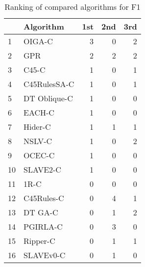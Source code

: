 \begin{table}
\footnotesize
\caption{Ranking of compared algorithms for F1}
\label{tab:places F1}
\begin{tabular}{llrrr}
\hline
 & Algorithm & 1st & 2nd & 3rd \\
\hline
1 & OIGA-C & 3 & 0 & 2 \\
2 & GPR & 2 & 2 & 2 \\
3 & C45-C & 1 & 0 & 1 \\
4 & C45RulesSA-C & 1 & 0 & 1 \\
5 & DT Oblique-C & 1 & 0 & 0 \\
6 & EACH-C & 1 & 0 & 0 \\
7 & Hider-C & 1 & 1 & 1 \\
8 & NSLV-C & 1 & 0 & 2 \\
9 & OCEC-C & 1 & 0 & 0 \\
10 & SLAVE2-C & 1 & 0 & 0 \\
11 & 1R-C & 0 & 0 & 0 \\
12 & C45Rules-C & 0 & 4 & 1 \\
13 & DT GA-C & 0 & 1 & 2 \\
14 & PGIRLA-C & 0 & 3 & 0 \\
15 & Ripper-C & 0 & 1 & 1 \\
16 & SLAVEv0-C & 0 & 1 & 0 \\
\hline
\end{tabular}
\end{table}
